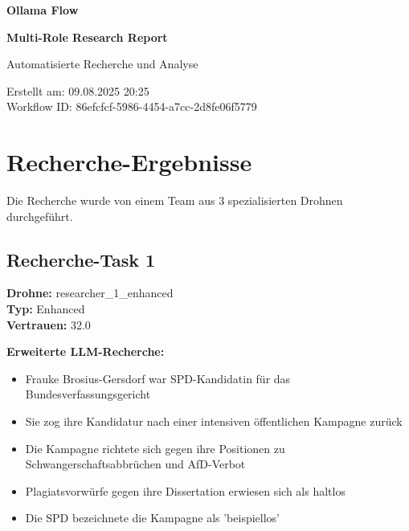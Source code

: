 \documentclass[12pt,a4paper]{article}
\begin{document}
\begin{titlepage}
    \centering
    
    \vspace*{2cm}
    
    {\Huge\bfseries Ollama Flow}
    
    {\Huge\bfseries Multi-Role Research Report}
    
    \vspace{2cm}
    
    {\Large Automatisierte Recherche und Analyse}
    
    \vspace{3cm}
    
    
    \vspace{2cm}
    
    
    \vfill
    
    {\large
    Erstellt am: 09.08.2025 20:25\\
    Workflow ID: 86efcfcf-5986-4454-a7cc-2d8fe06f5779
    }
    
\end{titlepage}

\newpage
\tableofcontents
\newpage

\section{Recherche-Ergebnisse}

Die Recherche wurde von einem Team aus 3 spezialisierten Drohnen durchgeführt.

\subsection{Recherche-Task 1}

\textbf{Drohne:} researcher\_1\_enhanced\\
\textbf{Typ:} Enhanced\\
\textbf{Vertrauen:} 32.0%

\textbf{Erweiterte LLM-Recherche:}
\begin{itemize}
\item Frauke Brosius-Gersdorf war SPD-Kandidatin für das Bundesverfassungsgericht
\item Sie zog ihre Kandidatur nach einer intensiven öffentlichen Kampagne zurück
\item Die Kampagne richtete sich gegen ihre Positionen zu Schwangerschaftsabbrüchen und AfD-Verbot
\item Plagiatsvorwürfe gegen ihre Dissertation erwiesen sich als haltlos
\item Die SPD bezeichnete die Kampagne als 'beispiellos'
\end{itemize}
\end{document}
